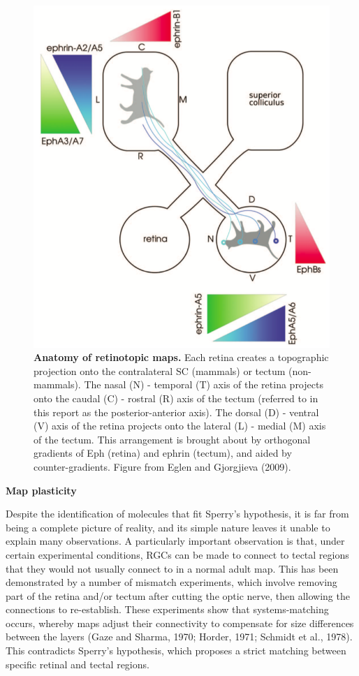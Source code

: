 \documentclass[11pt]{"article"}
\begin{document}
\begin{figure}
\includegraphics[scale=0.32]{Connections}
\caption{\textbf{Anatomy of retinotopic maps.} 
Each retina creates a topographic projection onto the contralateral SC (mammals) or tectum (non-mammals). The nasal (N) - temporal (T) axis of the retina projects onto the caudal (C) - rostral (R) axis of the tectum (referred to in this report as the posterior-anterior axis). The dorsal (D) - ventral (V) axis of the retina projects onto the lateral (L) - medial (M) axis of the tectum. This arrangement is brought about by orthogonal gradients of Eph (retina) and ephrin (tectum), and aided by counter-gradients. Figure from Eglen and Gjorgjieva (2009).}
\end{figure}

\vspace*{25pt}

\textbf{Map plasticity}

Despite the identification of molecules that fit Sperry's hypothesis, it is far from being a complete picture of reality, and its simple nature leaves it unable to explain many observations. A particularly important observation is that, under certain experimental conditions, RGCs can be made to connect to tectal regions that they would not usually connect to in a normal adult map. This has been demonstrated by a number of mismatch experiments, which involve removing part of the retina and/or tectum after cutting the optic nerve, then allowing the connections to re-establish. These experiments show that systems-matching occurs, whereby maps adjust their connectivity to compensate for size differences between the layers (Gaze and Sharma, 1970; Horder, 1971; Schmidt et al., 1978). This contradicts Sperry's hypothesis, which proposes a strict matching between specific retinal and tectal regions.
\\
\end{document}
